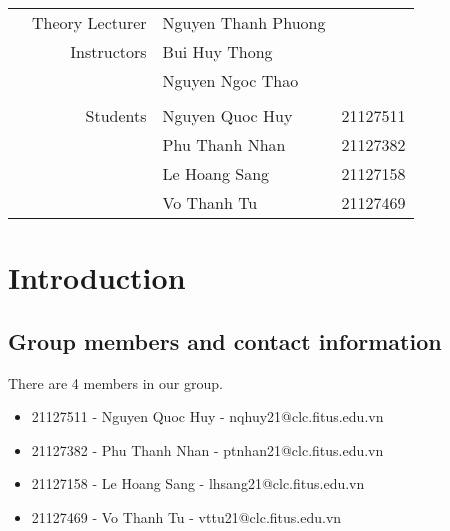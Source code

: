 \documentclass[12pt, a4paper]{article}
\begin{document}
\begin{titlepage}
    \begin{table}[h]
        \begin{adjustbox}{width=\columnwidth,center}
            \begin{tabular}{rrlc}
                 & Theory Lecturer & Nguyen Thanh Phuong &          \\
                 & Instructors     & Bui Huy Thong       &          \\
                 &                 & Nguyen Ngoc Thao    &          \\
                 &                 &                     &          \\
                 & Students        & Nguyen Quoc Huy     & 21127511 \\
                 &                 & Phu Thanh Nhan      & 21127382 \\
                 &                 & Le Hoang Sang       & 21127158 \\
                 &                 & Vo Thanh Tu         & 21127469
            \end{tabular}
        \end{adjustbox}
    \end{table}
\end{titlepage}




\pagestyle{fancy}
\fancyhf{}
\addtolength{\topmargin}{-0.70894pt}
\setlength{\headheight}{12.70894pt}

\rfoot{\textbf{\thepage}}




\tableofcontents

\pagebreak

\section{Introduction}

\subsection{Group members and contact information}
There are 4 members in our group.
\begin{itemize}
    \item 21127511 - Nguyen Quoc Huy - nqhuy21@clc.fitus.edu.vn
    \item 21127382 - Phu Thanh Nhan - ptnhan21@clc.fitus.edu.vn
    \item 21127158 - Le Hoang Sang - lhsang21@clc.fitus.edu.vn
    \item 21127469 - Vo Thanh Tu - vttu21@clc.fitus.edu.vn
\end{itemize}
\end{document}

